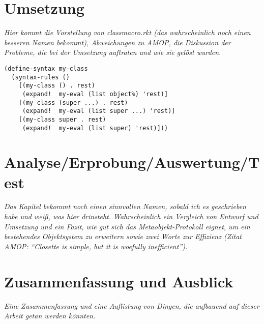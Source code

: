 
\pagestyle{diplHeadings}





\setcounter{page}{1}
\tableofcontents
\cleardoublepage 

\setcounter{page}{1} 
\mainmatter  
{}

 

 





\chapter{Umsetzung}  
\label{implementation}
\textit{Hier kommt die Vorstellung von classmacro.rkt (das wahrscheinlich noch einen besseren Namen bekommt), Abweichungen zu AMOP, die Diskussion der Probleme, die bei der Umsetzung auftraten und wie sie gelöst wurden.}



\begin{lstlisting}
(define-syntax my-class
  (syntax-rules ()
    [(my-class () . rest)
     (expand!  my-eval (list object%) 'rest)]
    [(my-class (super ...) . rest)
     (expand!  my-eval (list super ...) 'rest)]
    [(my-class super . rest)
     (expand!  my-eval (list super) 'rest)]))
\end{lstlisting}


\chapter{Analyse/Erprobung/Auswertung/Test}
\textit{Das Kapitel bekommt noch einen sinnvollen Namen, sobald ich es geschrieben habe und weiß, was hier drinsteht. Wahrscheinlich ein Vergleich von Entwurf und Umsetzung und ein Fazit, wie gut sich das Metaobjekt-Protokoll eignet, um ein bestehendes Objektsystem zu erweitern sowie zwei Worte zur Effizienz (Zitat AMOP: ``Closette is simple, but it is woefully inefficient'').}

\chapter{Zusammenfassung und Ausblick}
\textit{Eine Zusammenfassung und eine Auflistung von Dingen, die aufbauend auf dieser Arbeit getan werden könnten.}

\cleardoublepage
{}
{}

  
\cleardoublepage


\cleardoublepage




